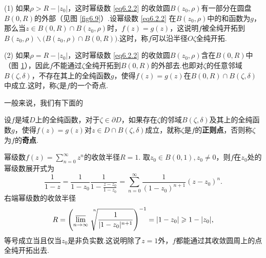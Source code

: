 (1) 如果$\rho>R-|z_0|$，这时幂级数 \eqref{eq6.2.2} 的收敛圆$B(z_0,\rho)$有一部分在圆盘$B(0,R)$的外部（见图 \ref{fig6.9}）.设幂级数 \eqref{eq6.2.2} 在$B(z_0,\rho)$中的和函数为$g$，那么当$z\in B(0,R)\cap B(z_0,\rho)$时，$f(z)=g(z)$，这说明$f$被全纯开拓到$B(z_0,\rho)\backslash\big(B(z_0,\rho)\cap B(0,R)\big)$.这时，称$f$可以沿半径$O\zeta$全纯开拓.
\begin{figure}[!ht]
  \centering
  \begin{minipage}{0.48\linewidth}
    \centering
    \caption{\label{fig6.9}}
  \end{minipage}\hfill
  \begin{minipage}{0.48\linewidth}
    \centering
    \caption{\label{fig6.10}}
  \end{minipage}
\end{figure}

(2) 如果$\rho=R-|z_0|$，这时幂级数 \eqref{eq6.2.2} 的收敛圆$B(z_0,\rho)$含在$B(0,R)$中（图 \ref{fig6.10}），因此$f$不能通过$\zeta$全纯开拓到$B(0,R)$的外部去.也即对$\zeta$的任意邻域$B(\zeta,\delta)$，不存在其上的全纯函数$g$，使得$f(z)=g(z)$在$B(0,R)\cap B(\zeta,\delta)$中成立.这时，称$\zeta$是$f$的一个奇点.

一般来说，我们有下面的
\begin{definition}
  设$f$是域$D$上的全纯函数，对于$\zeta\in\partial D$，如果存在$\zeta$的邻域$B(\zeta,\delta)$及其上的全纯函数$g$，使得$f(z)=g(z)$对$z\in D\cap B(\zeta,\delta)$成立，就称$\zeta$是$f$的\textbf{正则点}，否则称$\zeta$为$f$的\textbf{奇点}.
\end{definition}

\begin{example}\label{exam6.2.2}
  幂级数$f(z)=\sum_{n=0}^\infty z^n$的收敛半径$R=1$. 取$z_0\in B(0,1),z_0\ne0$，则$f$在$z_0$处的幂级数展开式为
  \[
    \frac1{1-z} = \frac1{1-z_0}\frac1{1-\frac{z-z_0}{1-z_0}}
    = \sum_{n=0}^\infty\frac1{(1-z_0)^{n+1}}(z-z_0)^n.
  \]
  右端幂级数的收敛半径
  \[
    R = \left(\varlimsup_{n\to\infty}\sqrt[\leftroot{-4}\uproot{20}n]{\frac1{|1-z_0|^{n+1}}}
    \right)^{-1}=|1-z_0|\ge1-|z_0|,
  \]
  等号成立当且仅当$z_0$是非负实数.这说明除了$z=1$外，$f$都能通过其收敛圆周上的点全纯开拓出去.
\end{example}

